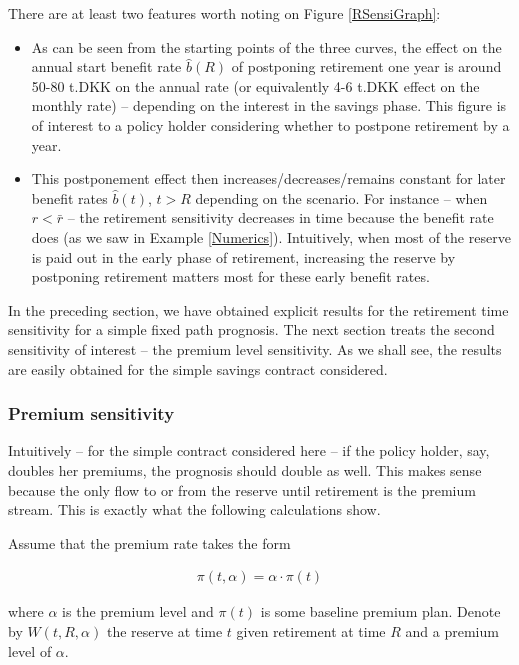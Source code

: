 \documentclass{article}
\newcommand{\1}[1]{\mathbbm{1}_{\left\lbrace #1 \right\rbrace}}
\theoremstyle{break}
\theoremstyle{remark}
\numberwithin{equation}{section}
\begin{document}
\begin{example}
There are at least two features worth noting on Figure \ref{RSensiGraph}:

\begin{itemize}
	\item As can be seen from the starting points of the three curves, the effect on the annual start benefit rate $\hat{b}(R)$ of postponing retirement one year is around 50-80 t.DKK on the annual rate (or equivalently 4-6 t.DKK effect on the monthly rate) -- depending on the interest in the savings phase. This figure is of interest to a policy holder considering whether to postpone retirement by a year.
	\item This postponement effect then increases/decreases/remains constant for later benefit rates $\hat{b}(t)$, $t>R$ depending on the scenario. For instance -- when $r < \bar{r}$ -- the retirement sensitivity decreases in time because the benefit rate does (as we saw in Example \ref{Numerics}). Intuitively, when most of the reserve is paid out in the early phase of retirement, increasing the reserve by postponing retirement matters most for these early benefit rates.
\end{itemize}
\end{example}

In the preceding section, we have obtained explicit results for the retirement time sensitivity for a simple fixed path prognosis. The next section treats the second sensitivity of interest -- the premium level sensitivity. As we shall see, the results are easily obtained for the simple savings contract considered.

\subsubsection{Premium sensitivity} \label{PremSensSect}

Intuitively -- for the simple contract considered here -- if the policy holder, say, doubles her premiums, the prognosis should double as well. This makes sense because the only flow to or from the reserve until retirement is the premium stream. This is exactly what the following calculations show.

Assume that the premium rate takes the form

\begin{align*}
	\pi (t,\alpha) = \alpha \cdot \pi(t)
\end{align*}

where $\alpha$ is the premium level and $\pi(t)$ is some baseline premium plan. Denote by $W(t,R,\alpha)$ the reserve at time $t$ given retirement at time $R$ and a premium level of $\alpha$.
\end{document}

